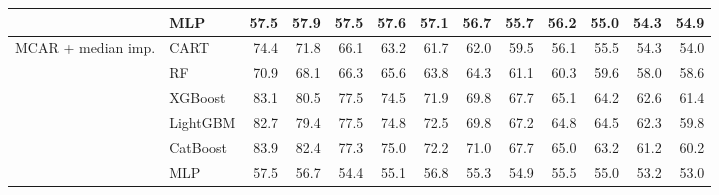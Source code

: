 \begin{table}[p]
\begin{tabular}{@{}llrrrrrrrrrrr@{}}
 & MLP & 57.5 & 57.9 & 57.5 & 57.6 & 57.1 & 56.7 & 55.7 & 56.2 & 55.0 & 54.3 & 54.9 \\
\midrule
MCAR + median imp. & CART & 74.4 & 71.8 & 66.1 & 63.2 & 61.7 & 62.0 & 59.5 & 56.1 & 55.5 & 54.3 & 54.0 \\
 & RF & 70.9 & 68.1 & 66.3 & 65.6 & 63.8 & 64.3 & 61.1 & 60.3 & 59.6 & 58.0 & 58.6 \\
 & XGBoost & 83.1 & 80.5 & 77.5 & 74.5 & 71.9 & 69.8 & 67.7 & 65.1 & 64.2 & 62.6 & 61.4 \\
 & LightGBM & 82.7 & 79.4 & 77.5 & 74.8 & 72.5 & 69.8 & 67.2 & 64.8 & 64.5 & 62.3 & 59.8 \\
 & CatBoost & 83.9 & 82.4 & 77.3 & 75.0 & 72.2 & 71.0 & 67.7 & 65.0 & 63.2 & 61.2 & 60.2 \\
 & MLP & 57.5 & 56.7 & 54.4 & 55.1 & 56.8 & 55.3 & 54.9 & 55.5 & 55.0 & 53.2 & 53.0 \\
\bottomrule
\end{tabular}
\end{table}

